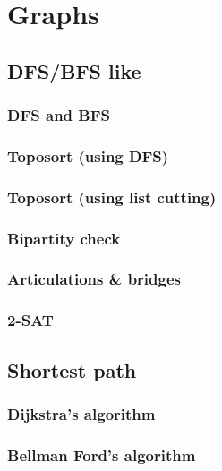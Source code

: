 \documentclass[a4paper]{article}
\begin{document}
\section{Graphs}
    \subsection{DFS/BFS like}
        \subsubsection{DFS and BFS}
            
        \subsubsection{Toposort (using DFS)}
            
        \subsubsection{Toposort (using list cutting)}
            
        \subsubsection{Bipartity check}
            
        \subsubsection{Articulations \& bridges}
            
        \subsubsection{2-SAT}
            

    \subsection{Shortest path}
        \subsubsection{Dijkstra's algorithm}
            
        \subsubsection{Bellman Ford's algorithm}
            
\end{document}
